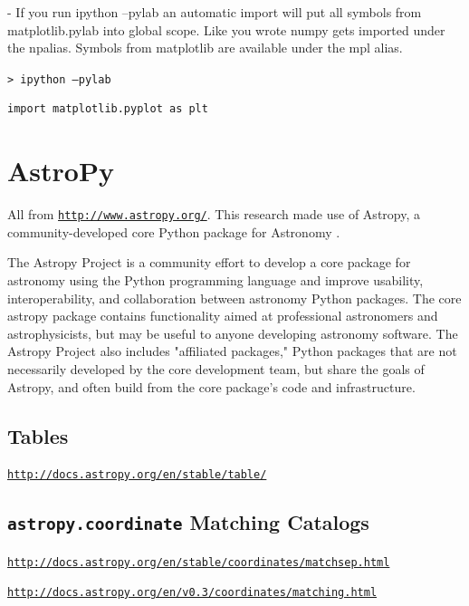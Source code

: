 \documentclass[11pt,a4paper]{article}
\begin{document}
- If you run ipython --pylab an automatic import will put all symbols
from matplotlib.pylab into global scope. Like you wrote numpy gets
imported under the npalias. Symbols from matplotlib are available
under the mpl alias.

{\tt > ipython --pylab}\\
\begin{lstlisting}
import matplotlib.pyplot as plt

\end{lstlisting}


\newpage
\section{{AstroPy}}
All from \href{http://www.astropy.org/}{\tt http://www.astropy.org/}.
This research made use of Astropy, a community-developed core Python
package for Astronomy \citep{Astropy13}. 

\smallskip
\smallskip
\noindent
The Astropy Project is a community effort to develop a core package
for astronomy using the Python programming language and improve
usability, interoperability, and collaboration between astronomy
Python packages. The core astropy package contains functionality aimed
at professional astronomers and astrophysicists, but may be useful to
anyone developing astronomy software. The Astropy Project also
includes "affiliated packages," Python packages that are not
necessarily developed by the core development team, but share the
goals of Astropy, and often build from the core package's code and
infrastructure.


\subsection{Tables} 
\smallskip
\smallskip
\noindent
\href{http://docs.astropy.org/en/stable/table/}{\tt http://docs.astropy.org/en/stable/table/}



\subsection{{\tt astropy.coordinate} Matching Catalogs}

\smallskip
\smallskip
\noindent
\href{http://docs.astropy.org/en/stable/coordinates/matchsep.html}{\tt http://docs.astropy.org/en/stable/coordinates/matchsep.html}

\smallskip
\smallskip
\noindent
\href{http://docs.astropy.org/en/v0.3/coordinates/matching.html}{\tt http://docs.astropy.org/en/v0.3/coordinates/matching.html}
\end{document}
